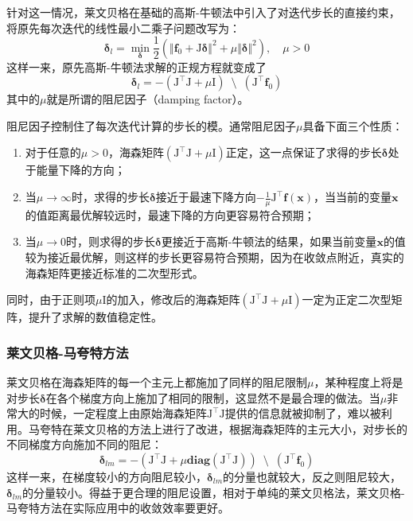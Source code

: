 针对这一情况，莱文贝格在基础的高斯-牛顿法中引入了对迭代步长的直接约束，将原先每次迭代的线性最小二乘子问题改写为：
\begin{equation}
    \bm{\delta}_{l} =
        \mathop{\min}_{\bm{\delta}} \frac{1}{2}
        \left(
            \Vert \mathbf{f}_0 + \mathrm{J}\bm{\delta} \Vert^2 +
            \mu \Vert \bm{\delta} \Vert^2
        \right), \quad \mu > 0
\end{equation}
这样一来，原先高斯-牛顿法求解的正规方程就变成了
\begin{equation}
    \bm{\delta}_l =
        -\left( \mathrm{J}^\top\mathrm{J}+\mu\mathrm{I} \right)
        \enspace\setminus\enspace
        \left( \mathrm{J}^\top\mathbf{f}_0 \right)
    \label{eq:levenberg}
\end{equation}
其中的$\mu$就是所谓的阻尼因子（damping factor）。

阻尼因子控制住了每次迭代计算的步长的模。通常阻尼因子$\mu$具备下面三个性质\citep{tingleff2004methods}：
\begin{enumerate}
    \item 对于任意的$\mu>0$，海森矩阵$(\mathrm{J}^\top\mathrm{J}+\mu\mathrm{I})$正定，这一点保证了求得的步长$\bm{\delta}$处于能量下降的方向；
    \item 当$\mu\to\infty$时，求得的步长$\bm{\delta}$接近于最速下降方向$-\frac{1}{\mu}\mathrm{J}^\top\mathbf{f}(\bm{x})$，当当前的变量$\bm{x}$ 的值距离最优解较远时，最速下降的方向更容易符合预期；
    \item 当$\mu\to0$时，则求得的步长$\bm{\delta}$更接近于高斯-牛顿法的结果，如果当前变量$\bm{x}$的值较为接近最优解，则这样的步长更容易符合预期，因为在收敛点附近，真实的海森矩阵更接近标准的二次型形式。
\end{enumerate}
同时，由于正则项$\mu\mathrm{I}$的加入，修改后的海森矩阵$(\mathrm{J}^\top\mathrm{J}+\mu\mathrm{I})$一定为正定二次型矩阵，提升了求解的数值稳定性。

\subsubsection*{莱文贝格-马夸特方法}

莱文贝格在海森矩阵的每一个主元上都施加了同样的阻尼限制$\mu$，某种程度上将是对步长$\bm{\delta}$在各个梯度方向上施加了相同的限制，这显然不是最合理的做法。当$\mu$非常大的时候，一定程度上由原始海森矩阵$\mathrm{J}^\top\mathrm{J}$提供的信息就被抑制了，难以被利用。马夸特在莱文贝格的方法上进行了改进，根据海森矩阵的主元大小，对步长的不同梯度方向施加不同的阻尼：
\begin{equation}
    \bm{\delta}_{lm} =
        -\left( \mathrm{J}^\top\mathrm{J}+\mu\mathbf{diag}(\mathrm{J}^\top\mathrm{J}) \right)
        \enspace\setminus\enspace
        \left( \mathrm{J}^\top \mathbf{f}_0 \right)
\end{equation}
这样一来，在梯度较小的方向阻尼较小，$\bm{\delta}_{lm}$的分量也就较大，反之则阻尼较大，$\bm{\delta}_{lm}$的分量较小。得益于更合理的阻尼设置，相对于单纯的莱文贝格法，莱文贝格-马夸特方法在实际应用中的收敛效率要更好。

